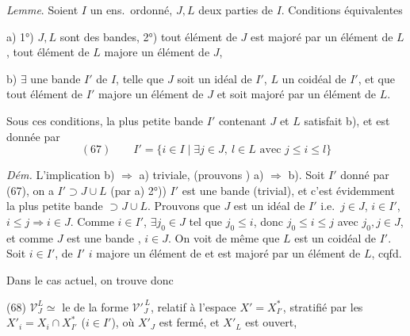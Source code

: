 \documentclass[11pt,a4paper]{article}
\begin{document}

\emph{Lemme}. Soient $I$ un ens.\ ordonné, $J,L$ deux parties de $I$. Conditions équivalentes

a) 1°) $J,L$ sont des bandes, 2°) tout élément de $J$ est majoré par un élément de $L$, tout élément de $L$ majore un élément de $J$, 


b) $\exists$ une bande $I'$ de $I$, telle que $J$ soit un idéal de $I'$, $L$ un coidéal de $I'$, et que tout élément de $I'$ majore un élément de $J$ et soit majoré par un élément de $L$.

Sous ces conditions,   la plus petite bande $I'$ contenant $J$ et $L$ satisfait b), et est donnée par
\[
(67)\qquad I'=\lbrace i\in I \mid \exists j\in J,\ l\in L \text{ avec } j\le i\le l\rbrace
\]

\emph{Dém.} L'implication b) $\Rightarrow$ a) triviale, (prouvons ) a) $\Rightarrow$ b). Soit $I'$ donné par (67), on a $I'\supset J\cup L$ (par a) 2°)) $I'$ est une bande (trivial), et c'est évidemment la plus petite bande $\supset J\cup L$. Prouvons que $J$ est un idéal de $I'$ i.e.\ $j\in J$, $i\in I'$, $i\le j\Rightarrow i\in J$. Comme $i\in I'$, $\exists j_0\in J$ tel que $j_0\le i$, donc $j_0\le i\le j$ avec $j_0,j\in J$, et comme $J$ est une bande , $i\in J$. \struck{\ill{}} On voit de même que $L$ est un coidéal de $I'$. Soit $i\in I'$, \struck{\ill{}}  de $I'$ $i$ majore un élément de  et est majoré par un élément de $L$, cqfd.


Dans le cas actuel, on trouve donc

(68) $\mathcal V_J^L\simeq$ le \ill{} de la forme $\mathcal V'^{\,L}_J$, relatif à l'espace $X'=X^{*}_{I'}$, stratifié par les $X'_i=X_i\cap X^{*}_{I'}$ ($i\in I'$), où $X'_J$ est fermé, et $X'_L$ est ouvert, 
\end{document}
